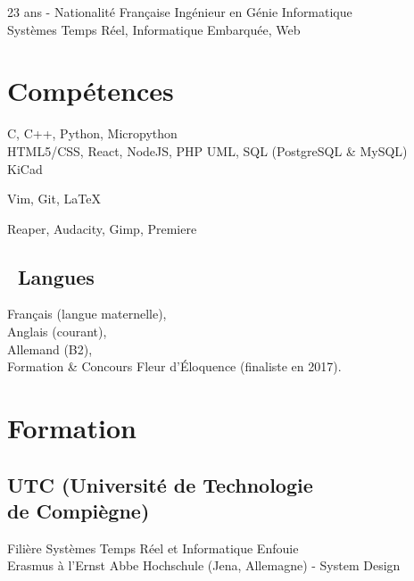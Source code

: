\documentclass[]{cv-template}
\begin{document}
%
%
{23 ans - Nationalité Française}
{Ingénieur en Génie Informatique \\Systèmes Temps Réel, Informatique Embarquée, Web}
{}
    
%
%
\begin{minipage}[t]{0.34\textwidth} 

\section{Compétences}
C, C++, Python, Micropython\\ 

HTML5/CSS, React, NodeJS, PHP
UML, SQL (PostgreSQL \& MySQL)\\

KiCad

Vim, Git, \LaTeX

Reaper, Audacity, Gimp, Premiere

\sectionsep
\subsection{\ Langues}
Français (langue maternelle), \\
Anglais (courant), \\
Allemand (B2),\\

Formation \& Concours Fleur d'Éloquence (finaliste en 2017).
\sectionsep

\section{Formation} 

\subsection[UTC (Université de Technologie de Compiègne)]{UTC (Université de Technologie\\ de Compiègne)}
Filière Systèmes Temps Réel et Informatique Enfouie\\
Erasmus à l'Ernst Abbe Hochschule (Jena, Allemagne) - System Design\\
\sectionsep


\end{minipage}
\end{document}
